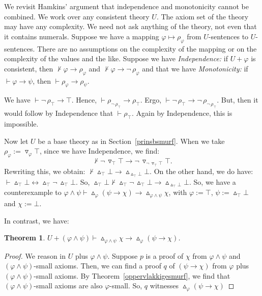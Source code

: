 \documentclass{amsart}
\renewcommand{\iff}{\leftrightarrow}
\renewcommand{\phi}{\varphi}
\newtheorem{theorem}{Theorem}[section]
\newcommand{\apr}{{\vartriangle}}
\newcommand{\aco}{{\triangledown}}
\begin{document}
We revisit Hamkins' argument that independence and monotonicity cannot be combined.
We work over any consistent theory $U$. The axiom set of the theory may have any complexity.
We need not ask anything of the theory, not even that it contains numerals.
Suppose we have a mapping $\phi \mapsto \rho_\phi$ from $U$-sentences to $U$-sentences. There are no assumptions on the
complexity of the mapping or on the complexity of the values and the like. Suppose we have \emph{Independence:} if $U+\phi$ is consistent, then
$\nvdash \phi \to \rho_\phi$ and $\nvdash \phi \to \neg\, \rho_\phi$ and that we have
\emph{Monotonicity:} if $\vdash \phi \to \psi$, then $\vdash \rho_\phi \to \rho_\psi$.

We have $\vdash \neg\, \rho_\top \to \top$. Hence, $\vdash \rho_{\neg \,\rho_\top} \to \rho_\top$.
Ergo,  $\vdash  \neg\, \rho_\top \to \neg\,  \rho_{\neg \,\rho_\top} $. But, then it would follow by Independence that 
$\vdash \rho_\top$. Again by Independence, this is impossible.


Now let $U$ be a base theory as in Section~\ref{prinsbsmurf}.
When we take  $\rho_\phi := \aco_\phi \top$, since we have Independence, we find:
\[\nvdash  \neg\, \aco_\top\top \to \neg\,  \aco_{\neg \,\aco_\top\top}\top.\]
Rewriting this, we obtain: $\nvdash   \apr_\top\bot \to   \apr_{\apr_\top\bot}\bot$.
On the other hand, we do have: $\vdash   \apr_\top\bot \iff   \apr_\top \neg\, \apr_\top\bot$.
So, $\apr_\top \bot \nvdash   \apr_\top \neg\, \apr_\top\bot \to   \apr_{\apr_\top\bot}\bot$. So, we have a counterexample
 to $\phi \wedge \psi\vdash \apr_\phi (\psi \to \chi) \to \apr_{\phi\wedge \psi} \chi$, with $\phi := \top$, $\psi := \apr_\top\bot$ and
 $\chi := \bot$.
 
 In contrast, we have:
 
\begin{theorem}
$U+ (\phi\wedge\psi)\vdash \apr_{\phi\wedge \psi} \chi \to \apr_\phi (\psi \to \chi)$.
\end{theorem}

\begin{proof}
We reason in $U$ plus $\phi\wedge \psi$. Suppose $p$ is a proof of $\chi$ from
$\phi \wedge \psi$ and $(\phi\wedge\psi)$-small axioms. Then,
we can find a proof $q$ of $(\psi\to \chi)$ from $\phi$ plus $(\phi\wedge \psi)$-small axioms.
By Theorem~\ref{oppervlakkigesmurf}, we find that  $(\phi\wedge \psi)$-small axioms are also
$\phi$-small. So, $q$ witnesses $\apr_\phi (\psi \to \chi)$
\end{proof}
\end{document}

